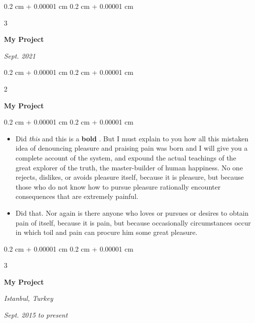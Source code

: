 \documentclass[10pt, letterpaper]{article}
\newenvironment{highlights}{
    \begin{itemize}[
        topsep=0.10 cm,
        parsep=0.10 cm,
        partopsep=0pt,
        itemsep=0pt,
        leftmargin=0.4 cm + 10pt + 0.6 cm
    ]
}{
    \end{itemize}
} %
\newenvironment{onecolentry}{
    \begin{adjustwidth}{
        0.2 cm + 0.00001 cm
    }{
        0.2 cm + 0.00001 cm
    }
}{
    \end{adjustwidth}
} %
\newenvironment{onecolentrybulleted}{
    \onecolentry
    \setcolumnwidth{0.6 cm, \fill}
    \begin{paracol}{2}
    \vspace*{\fill}
    \textbullet
    \vspace*{3px}
    \vspace*{\fill}
    \switchcolumn
}{
    \end{paracol}
    \endonecolentry
} %
\newenvironment{threecolentry}[3][]{
    \onecolentry
    \def\thirdColumn{#3}
    \setcolumnwidth{0.6 cm, \fill, 4.5 cm}
    \begin{paracol}{3}
    #2 \switchcolumn
}{
    \switchcolumn \raggedleft \thirdColumn
    \end{paracol}
    \endonecolentry
} %
\let\hrefWithoutArrow\href
\renewcommand{\href}[2]{\hrefWithoutArrow{#1}{\mbox{\ifthenelse{\equal{#2}{}}{ }{#2 }\raisebox{.15ex}{\footnotesize \faExternalLink*}}}}
\begin{document}
        \vspace{0.2 cm-3px}

        \begin{threecolentry}{
            \vspace*{\fill}
            \textbullet
            \vspace*{3px}
            \vspace*{\fill}
        }{
            
            
        \textit{Sept. 2021}}
            \textbf{My Project}
        \end{threecolentry}



        \vspace{0.2 cm-3px}

        \begin{onecolentrybulleted}
            \textbf{My Project}
        \end{onecolentrybulleted}

        \vspace{0.10 cm-3px}
        \begin{onecolentry}
            \begin{highlights}
                \item Did \textit{this} and this is a \textbf{bold} \href{https://example.com}{link}. But I must explain to you how all this mistaken idea of denouncing pleasure and praising pain was born and I will give you a complete account of the system, and expound the actual teachings of the great explorer of the truth, the master-builder of human happiness. No one rejects, dislikes, or avoids pleasure itself, because it is pleasure, but because those who do not know how to pursue pleasure rationally encounter consequences that are extremely painful.
                \item Did that. Nor again is there anyone who loves or pursues or desires to obtain pain of itself, because it is pain, but because occasionally circumstances occur in which toil and pain can procure him some great pleasure.
            \end{highlights}
        \end{onecolentry}


        \vspace{0.2 cm-3px}

        \begin{threecolentry}{
            \vspace*{\fill}
            \textbullet
            \vspace*{3px}
            \vspace*{\fill}
        }{
        \textit{Istanbul, Turkey}    
            
        \textit{Sept. 2015 to present}}
            \textbf{My Project}
        \end{threecolentry}
\end{document}
